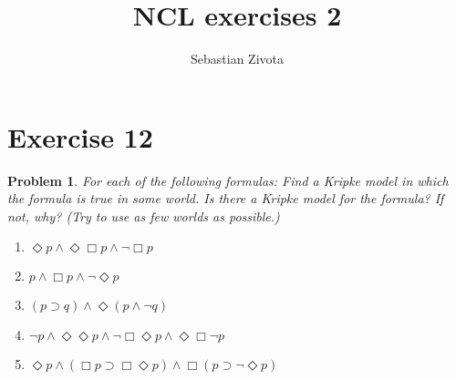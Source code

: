 \documentclass[a4paper,10pt]{article}
\title{NCL exercises 2}
\author{Sebastian Zivota}
\newcommand{\imp}{\supset}
\newcommand{\Dia}{\Diamond}
\newtheorem*{problem*}{Problem}
\theoremstyle{definition}
\begin{document}
\maketitle

\section*{Exercise 12}

\begin{problem*}
For each of the following formulas:
Find a Kripke model in which the formula is true in some world. Is
there a Kripke model for the formula?  If not, why?
(Try to use as few worlds as possible.)

\begin{enumerate}
 \item $\Dia p ∧ \Dia \Box p ∧ ¬ \Box p$
 \item $p ∧ \Box p ∧ ¬ \Dia p$
 \item $(p \imp q) ∧ \Dia (p ∧ ¬q)$
 \item $¬ p ∧ \Dia \Dia p ∧ ¬ \Box\Dia p ∧ \Dia\Box ¬p$
 \item $\Dia p ∧ (\Box p \imp \Box\Dia p) ∧ \Box (p \imp ¬\Dia p)$
\end{enumerate}
\end{problem*}
\end{document}
